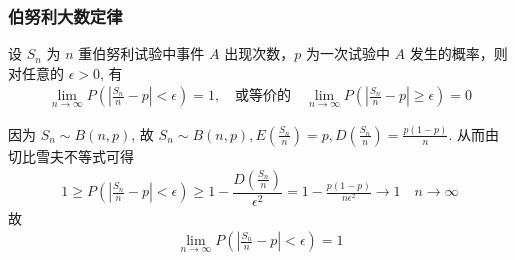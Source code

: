 \begin{frame}
	\frametitle{伯努利大数定律}
	\begin{thm}
		设 $S_n$ 为 $n$ 重伯努利试验中事件 $A$ 出现次数，$p$ 为一次试验中 $A$ 发生的概率，则对任意的 $\epsilon>0$, 有
		\begin{eqnarray*}
			\lim_{n\rightarrow\infty} P (|\frac{S_n}{n}-p|<\epsilon)=1, \quad\mbox{或等价的}\quad \lim_{n\rightarrow\infty} P (|\frac{S_n}{n}-p|\ge\epsilon)=0
		\end{eqnarray*}
	\end{thm}
	\pause \zheng 因为 $S_n\sim B (n,p)$, 故 $S_n\sim B (n,p), E (\frac{S_n}{n})=p, D (\frac{S_n}{n})=\frac{p (1-p)}{n}$. \pause 从而由切比雪夫不等式可得
	\begin{eqnarray*}
		1\ge P(|\frac{S_n}{n}-p|<\epsilon)\ge 1-\dfrac{D(\frac{S_n}{n})}{\epsilon^2}=1-\frac{p(1-p)}{n\epsilon^2}\rightarrow 1  \quad n\rightarrow \infty
	\end{eqnarray*}
	\pause 故
	\begin{eqnarray*}
		\lim_{n\rightarrow\infty}P(|\frac{S_n}{n}-p|<\epsilon)=1
	\end{eqnarray*}
\end{frame}

